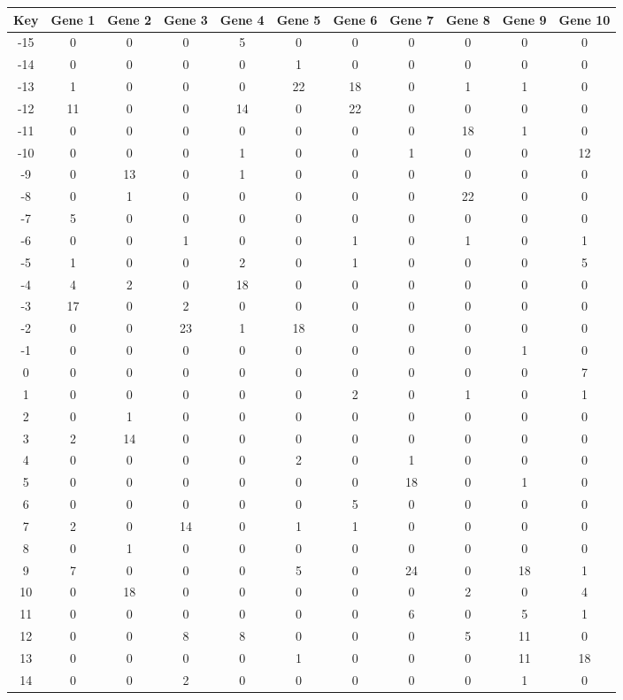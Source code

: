 \begin{tabular}{|c|c|c|c|c|c|c|c|c|c|c|}
\hline
Key & Gene 1 & Gene 2 & Gene 3 & Gene 4 & Gene 5 & Gene 6 & Gene 7 & Gene 8 & Gene 9 & Gene 10 \\
\hline
-15 & 0 & 0 & 0 & 5 & 0 & 0 & 0 & 0 & 0 & 0 \\
-14 & 0 & 0 & 0 & 0 & 1 & 0 & 0 & 0 & 0 & 0 \\
-13 & 1 & 0 & 0 & 0 & 22 & 18 & 0 & 1 & 1 & 0 \\
-12 & 11 & 0 & 0 & 14 & 0 & 22 & 0 & 0 & 0 & 0 \\
-11 & 0 & 0 & 0 & 0 & 0 & 0 & 0 & 18 & 1 & 0 \\
-10 & 0 & 0 & 0 & 1 & 0 & 0 & 1 & 0 & 0 & 12 \\
-9 & 0 & 13 & 0 & 1 & 0 & 0 & 0 & 0 & 0 & 0 \\
-8 & 0 & 1 & 0 & 0 & 0 & 0 & 0 & 22 & 0 & 0 \\
-7 & 5 & 0 & 0 & 0 & 0 & 0 & 0 & 0 & 0 & 0 \\
-6 & 0 & 0 & 1 & 0 & 0 & 1 & 0 & 1 & 0 & 1 \\
-5 & 1 & 0 & 0 & 2 & 0 & 1 & 0 & 0 & 0 & 5 \\
-4 & 4 & 2 & 0 & 18 & 0 & 0 & 0 & 0 & 0 & 0 \\
-3 & 17 & 0 & 2 & 0 & 0 & 0 & 0 & 0 & 0 & 0 \\
-2 & 0 & 0 & 23 & 1 & 18 & 0 & 0 & 0 & 0 & 0 \\
-1 & 0 & 0 & 0 & 0 & 0 & 0 & 0 & 0 & 1 & 0 \\
0 & 0 & 0 & 0 & 0 & 0 & 0 & 0 & 0 & 0 & 7 \\
1 & 0 & 0 & 0 & 0 & 0 & 2 & 0 & 1 & 0 & 1 \\
2 & 0 & 1 & 0 & 0 & 0 & 0 & 0 & 0 & 0 & 0 \\
3 & 2 & 14 & 0 & 0 & 0 & 0 & 0 & 0 & 0 & 0 \\
4 & 0 & 0 & 0 & 0 & 2 & 0 & 1 & 0 & 0 & 0 \\
5 & 0 & 0 & 0 & 0 & 0 & 0 & 18 & 0 & 1 & 0 \\
6 & 0 & 0 & 0 & 0 & 0 & 5 & 0 & 0 & 0 & 0 \\
7 & 2 & 0 & 14 & 0 & 1 & 1 & 0 & 0 & 0 & 0 \\
8 & 0 & 1 & 0 & 0 & 0 & 0 & 0 & 0 & 0 & 0 \\
9 & 7 & 0 & 0 & 0 & 5 & 0 & 24 & 0 & 18 & 1 \\
10 & 0 & 18 & 0 & 0 & 0 & 0 & 0 & 2 & 0 & 4 \\
11 & 0 & 0 & 0 & 0 & 0 & 0 & 6 & 0 & 5 & 1 \\
12 & 0 & 0 & 8 & 8 & 0 & 0 & 0 & 5 & 11 & 0 \\
13 & 0 & 0 & 0 & 0 & 1 & 0 & 0 & 0 & 11 & 18 \\
14 & 0 & 0 & 2 & 0 & 0 & 0 & 0 & 0 & 1 & 0 \\
\hline
\end{tabular}